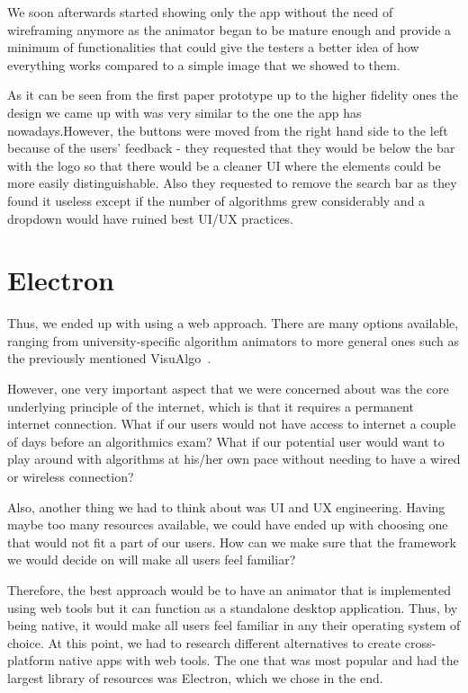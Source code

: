 \documentclass{l4proj}
\begin{document}
We soon afterwards started showing only the app without the need of wireframing anymore as the animator began to be
mature enough and provide a minimum of functionalities that could give the testers a better idea of how everything
works compared to a simple image that we showed to them.

As it can be seen from the first paper prototype up to the higher fidelity ones the design we came up with was very
similar to the one the app has nowadays.However, the buttons were moved from the right hand side to the left because
of the users' feedback - they requested that they would be below the bar with the logo so that there would be a cleaner
UI where the elements could be more easily distinguishable. Also they requested to remove the search bar as they found
it useless except if the number of algorithms grew considerably and a dropdown would have ruined best UI/UX practices.

\section{Electron}

Thus, we ended up with using a web approach. There are many options available, ranging from university-specific algorithm animators to more general ones such as the previously mentioned VisuAlgo~\cite{visualgo}.

However, one very important aspect that we were concerned about was the core underlying principle of the internet, which is that it requires a permanent internet connection. What if our users would not have access to internet a couple of days before an algorithmics exam? What if our potential user would want to play around with algorithms at his/her own pace without needing to have a wired or wireless connection?

Also, another thing we had to think about was UI and UX engineering. Having maybe too many resources available, we could have ended up with choosing one that would not fit a part of our users. How can we make sure that the framework we would decide on will make all users feel familiar?

Therefore, the best approach would be to have an animator that is implemented using web tools but it can function as a standalone desktop application. Thus, by being native, it would make all users feel familiar in any their operating system of choice. At this point, we had to research different alternatives to create cross-platform native apps with web tools. The one that was most popular and had the largest library of resources was Electron, which we chose in the end.
\end{document}
